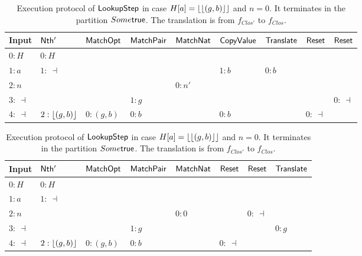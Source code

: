 \begin{table}[H]
  \scriptsize
  \begin{tabular}{l||l|l|l|l|l|l|l|l}
    Input       & $\mathsf{Nth'}$      & $\mathsf{MatchOpt}$       & $\mathsf{MatchPair}$     & $\mathsf{MatchNat}$ & $\mathsf{CopyValue}$  & $\mathsf{Translate}$ & $\mathsf{Reset}$ & $\mathsf{Reset}$ \\ \hline
    $0:H$       & $0:H$            &                       &                      &                 &                   &                  &              &              \\
    $1:a$       & $1:~\dashv$      &                       &                      &                 & $1:b$             & $0:b$            &              &              \\
    $2:n$       &                  &                       &                      & $0:n'$          &                   &                  &              &              \\
    $3:~\dashv$ &                  &                       & $1: g$               &                 &                   &                  &              & $0:~\dashv$  \\
    $4:~\dashv$ & $2:\left\lfloor {(g,b)} \right\rfloor$ & $0:(g,b)$             & $0:b$                &                 & $0:b$             &                  & $0:~\dashv$  &              \\
  \end{tabular}
  \caption{Execution protocol of $\mathsf{LookupStep}$ in case $H[a] = \left\lfloor {\left\lfloor {(g,b)} \right\rfloor} \right\rfloor$ and $n=S~n'$.  It terminates in the partition $\None$.  The
    translation is from $f_{next}$ to $f_{add}$.}
  \label{tab:exec-LookupStep-S}
  \begin{tabular}{l||l|l|l|l|l|l|l}
    Input       & $\mathsf{Nth'}$      & $\mathsf{MatchOpt}$       & $\mathsf{MatchPair}$     & $\mathsf{MatchNat}$ & $\mathsf{Reset}$ & $\mathsf{Reset}$ & $\mathsf{Translate}$ \\ \hline
    $0:H$       & $0:H$            &                       &                      &                 &              &              &                  \\
    $1:a$       & $1:~\dashv$      &                       &                      &                 &              &              &                  \\
    $2:n$       &                  &                       &                      & $0:0$           &              & $0:~\dashv$  &                  \\
    $3:~\dashv$ &                  &                       & $1: g$               &                 &              &              & $0:g$            \\
    $4:~\dashv$ & $2:\left\lfloor {(g,b)} \right\rfloor$ & $0:(g,b)$             & $0:b$                &                 & $0:~\dashv$  &              &                  \\
  \end{tabular}
  \caption{Execution protocol of $\mathsf{LookupStep}$ in case $H[a] = \left\lfloor {\left\lfloor {(g,b)} \right\rfloor} \right\rfloor$ and $n=0$.  It terminates in the partition $Some\mathsf{true}$.  The
    translation is from $f_{Clos'}$ to $f_{Clos}$.}
  \label{tab:exec-LookupStep-0}
\end{table}

